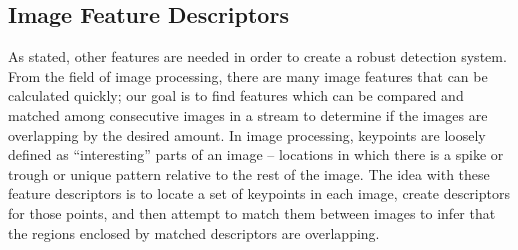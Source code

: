 






\subsection{Image Feature Descriptors}

As stated, other features are needed in order to create a robust detection system.
From the field of image processing, there are many image features that can be calculated quickly; our goal is to find features which can be compared and matched among consecutive images in a stream to determine if the images are overlapping by the desired amount.
In image processing, keypoints are loosely defined as ``interesting'' parts of an image -- locations in which there is a spike or trough or unique pattern relative to the rest of the image.
The idea with these feature descriptors is to locate a set of keypoints in each image, create descriptors for those points, and then attempt to match them between images to infer that the regions enclosed by matched descriptors are overlapping.

